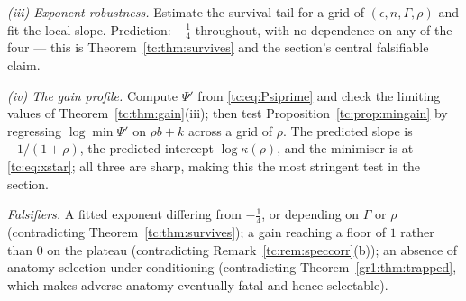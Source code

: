 \documentclass[11pt]{article}
\newcommand{\PrintRefs}{\printbibliography[title={References}]}%
\newcommand{\PrintRefs}{}%
\numberwithin{equation}{section}
\theoremstyle{plain}
\theoremstyle{definition}
\theoremstyle{remark}
\begin{document}
\emph{(iii) Exponent robustness.} Estimate the survival tail for a grid
of $(\epsilon,n,\Gamma,\rho)$ and fit the local slope. Prediction:
$-\tfrac14$ throughout, with no dependence on any of the four ---
this is Theorem~\ref{tc:thm:survives} and the section's central
falsifiable claim.

\emph{(iv) The gain profile.} Compute $\Psi'$ from
\eqref{tc:eq:Psiprime} and check the limiting values of
Theorem~\ref{tc:thm:gain}(iii); then test
Proposition~\ref{tc:prop:mingain} by regressing $\log\min\Psi'$ on
$\rho b+k$ across a grid of $\rho$. The predicted slope is
$-1/(1+\rho)$, the
predicted intercept $\log\kappa(\rho)$, and the minimiser is at
\eqref{tc:eq:xstar}; all three are sharp, making this the most stringent
test in the section.

\emph{Falsifiers.} A fitted exponent differing from $-\tfrac14$, or
depending on $\Gamma$ or $\rho$ (contradicting
Theorem~\ref{tc:thm:survives}); a gain reaching a floor of $1$ rather
than $0$ on the plateau (contradicting
Remark~\ref{tc:rem:speccorr}(b)); an absence of anatomy selection under
conditioning (contradicting Theorem~\ref{gr1:thm:trapped}, which makes
adverse anatomy eventually fatal and hence selectable).


\PrintRefs
\end{document}
